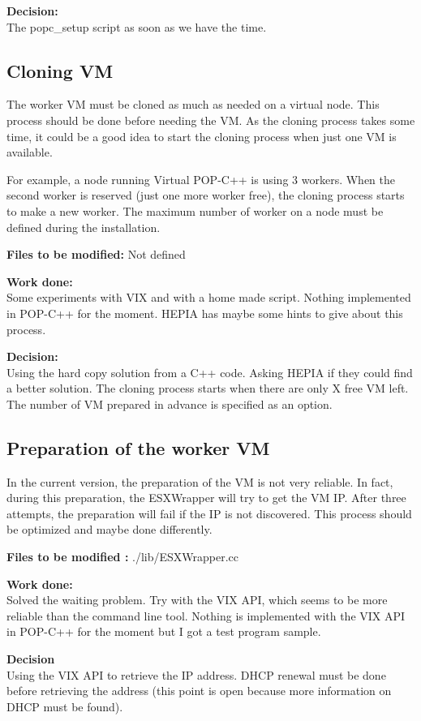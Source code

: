 \textbf{Decision:}\\
The popc\_setup script as soon as we have the time. 

\subsection{Cloning VM}
The worker VM must be cloned as much as needed on a virtual node. This process should be done before needing the VM. As the cloning process takes some time, it could be a good idea to start the cloning process when just one VM is available. 

For example, a node running Virtual POP-C++ is using 3 workers. When the second worker is reserved (just one more worker free), the cloning process starts to make a new worker. The maximum number of worker on a node must be defined during the installation.\s

\textbf{Files to be modified: } Not defined \s

\textbf{Work done:}\\
Some experiments with VIX and with a home made script. Nothing implemented in POP-C++ for the moment. HEPIA has maybe some hints to give about this process. \s

\textbf{Decision:}\\
Using the hard copy solution from a C++ code. Asking HEPIA if they could find a better solution. The cloning process starts when there are only X free VM left. The number of VM prepared in advance is specified as an option.

\subsection{Preparation of the worker VM}
In the current version, the preparation of the VM is not very reliable. In fact, during this preparation, the ESXWrapper will try to get the VM IP. After three attempts, the preparation will fail if the IP is not discovered. This process should be optimized and maybe done differently.\s

\textbf{Files to be modified : } ./lib/ESXWrapper.cc\s

\textbf{Work done:}\\
Solved the waiting problem. Try with the VIX API, which seems to be more reliable than the command line tool. Nothing is implemented with the VIX API in POP-C++ for the moment but I got a test program sample. \s

\textbf{Decision}\\
Using the VIX API to retrieve the IP address. DHCP renewal must be done before retrieving the address (this point is open because more information on DHCP must be found).

